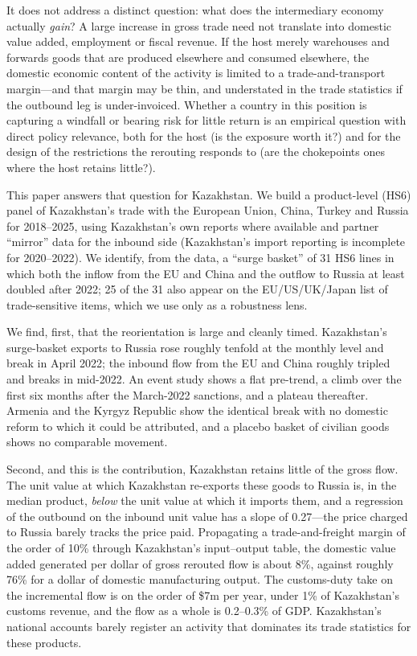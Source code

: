 \documentclass[12pt]{article}
\begin{document}
It does not address a distinct question: what does the intermediary economy actually
\emph{gain}? A large increase in gross trade need not translate into domestic value added,
employment or fiscal revenue. If the host merely warehouses and forwards goods that are
produced elsewhere and consumed elsewhere, the domestic economic content of the activity is
limited to a trade-and-transport margin---and that margin may be thin, and understated in the
trade statistics if the outbound leg is under-invoiced. Whether a country in this position is
capturing a windfall or bearing risk for little return is an empirical question with direct
policy relevance, both for the host (is the exposure worth it?) and for the design of the
restrictions the rerouting responds to (are the chokepoints ones where the host retains
little?).

This paper answers that question for Kazakhstan. We build a product-level (HS6) panel of
Kazakhstan's trade with the European Union, China, Turkey and Russia for 2018--2025, using
Kazakhstan's own reports where available and partner ``mirror'' data for the inbound side
(Kazakhstan's import reporting is incomplete for 2020--2022). We identify, from the data, a
``surge basket'' of 31 HS6 lines in which both the inflow from the EU and China and the
outflow to Russia at least doubled after 2022; 25 of the 31 also appear on the EU/US/UK/Japan
list of trade-sensitive items, which we use only as a robustness lens.

We find, first, that the reorientation is large and cleanly timed. Kazakhstan's surge-basket
exports to Russia rose roughly tenfold at the monthly level and break in April 2022; the
inbound flow from the EU and China roughly tripled and breaks in mid-2022. An event study
shows a flat pre-trend, a climb over the first six months after the March-2022 sanctions, and
a plateau thereafter. Armenia and the Kyrgyz Republic show the identical break with no
domestic reform to which it could be attributed, and a placebo basket of civilian goods shows
no comparable movement.

Second, and this is the contribution, Kazakhstan retains little of the gross flow. The
unit value at which Kazakhstan re-exports these goods to Russia is, in the median product,
\emph{below} the unit value at which it imports them, and a regression of the outbound on the
inbound unit value has a slope of 0.27---the price charged to Russia barely tracks the price
paid. Propagating a trade-and-freight margin of the order of 10\% through Kazakhstan's
input--output table, the domestic value added generated per dollar of gross rerouted flow is
about 8\%, against roughly 76\% for a dollar of domestic manufacturing output. The
customs-duty take on the incremental flow is on the order of \$7m per year, under 1\% of
Kazakhstan's customs revenue, and the flow as a whole is 0.2--0.3\% of GDP. Kazakhstan's
national accounts barely register an activity that dominates its trade statistics for these
products.
\end{document}
